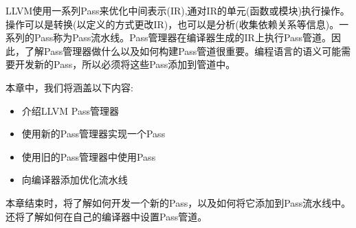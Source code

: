 LLVM使用一系列Pass来优化中间表示(IR),通对IR的单元(函数或模块)执行操作。操作可以是转换(以定义的方式更改IR)，也可以是分析(收集依赖关系等信息)。一系列的Pass称为Pass流水线。Pass管理器在编译器生成的IR上执行Pass管道。因此，了解Pass管理器做什么以及如何构建Pass管道很重要。编程语言的语义可能需要开发新的Pass，所以必须将这些Pass添加到管道中。\par

本章中，我们将涵盖以下内容:\par

\begin{itemize}
	\item 介绍LLVM Pass管理器
	\item 使用新的Pass管理器实现一个Pass
	\item 使用旧的Pass管理器中使用Pass
	\item 向编译器添加优化流水线
\end{itemize}

本章结束时，将了解如何开发一个新的Pass，以及如何将它添加到Pass流水线中。还将了解如何在自己的编译器中设置Pass管道。\par














